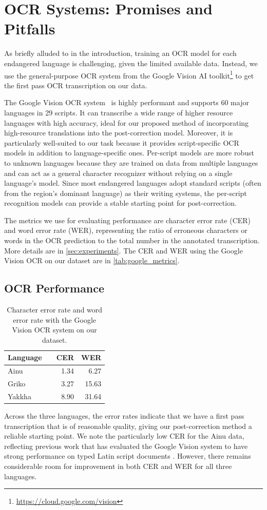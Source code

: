 \section{OCR Systems: Promises and Pitfalls}
\label{sec:analysis}
As briefly alluded to in the introduction, training an OCR model for each endangered language is challenging, given the limited available data. 
Instead, we use the general-purpose OCR system from the Google Vision AI toolkit\footnote{\url{https://cloud.google.com/vision}} to get the first pass OCR transcription on our data.

The Google Vision OCR system~\cite{fujii2017sequence,ingle2019scalable} is highly performant and supports 60 major languages in 29 scripts. It can transcribe a wide range of higher resource languages with high accuracy, ideal for our proposed method of incorporating high-resource translations into the post-correction model. Moreover, it is particularly well-suited to our task because it provides script-specific OCR models in addition to language-specific ones. Per-script models are more robust to unknown languages because they are trained on data from multiple languages and can act as a general character recognizer without relying on a single language's model. Since most endangered languages adopt standard scripts (often from the region's dominant language) as their writing systems, the per-script recognition models can provide a stable starting point for post-correction.

The metrics we use for evaluating performance are character error rate (CER) and word error rate (WER), representing the ratio of erroneous characters or words in the OCR prediction to the total number in the annotated transcription. More details are in \autoref{sec:experiments}. The CER and WER using the Google Vision OCR on our dataset are in \autoref{tab:google_metrics}.

\subsection{OCR Performance}
\begin{table}[tb]
    \centering
    \small
    \begin{tabular}{lcrr}
    \toprule
    Language && CER & WER \\
    \midrule
    Ainu && 1.34 & 6.27 \\
    Griko && 3.27 & 15.63 \\
    Yakkha && 8.90 & 31.64 \\
    \bottomrule
    \end{tabular}
    \caption{Character error rate and word error rate with the Google Vision OCR system on our dataset.}
    \label{tab:google_metrics}
\end{table}
Across the three languages, the error rates indicate that we have a first pass transcription that is of reasonable quality, giving our post-correction method a reliable starting point. We note the particularly low CER for the Ainu data, reflecting previous work that has evaluated the Google Vision system to have strong performance on typed Latin script documents \cite{fujii2017sequence}. However, there remains considerable room for improvement in both CER and WER for all three languages.

